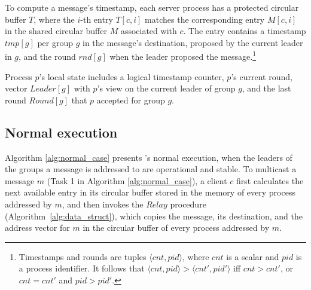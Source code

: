 To compute a message's timestamp, each server process has a protected circular buffer $T$, where the $i$-th entry $T[c,i]$ matches the corresponding entry $M[c,i]$ in the shared circular buffer $M$ associated with $c$.
The entry contains a timestamp $tmp[g]$ per group $g$ in the message's destination, proposed by the current leader in $g$, and the round $rnd[g]$ when the leader proposed the message.\footnote{Timestamps and rounds are tuples $\langle cnt,pid \rangle$, where $cnt$ is a scalar and $pid$ is a process identifier. It follows that $\langle cnt,pid \rangle > \langle cnt',pid' \rangle$ iff $cnt > cnt'$, or $cnt = cnt'$ and $pid > pid'$.}

Process $p$'s local state includes a logical timestamp counter, $p$'s current round, vector $Leader[g]$ with $p$'s view on the current leader of group $g$, and the last round $Round[g]$ that $p$ accepted for group $g$.











\subsection{Normal execution}
\label{sec:normalcase}



% 

Algorithm \ref{alg:normal_case} presents \libname's normal execution, when the leaders of the groups a message is addressed to are operational and stable.
To multicast a message $m$ (Task 1 in Algorithm \ref{alg:normal_case}), a client $c$ first calculates the next available entry in its circular buffer stored in the memory of every process addressed by $m$, and then invokes the $Relay$ procedure (Algorithm~\ref{alg:data_struct}), which copies the message, its destination, and the address vector for $m$ in the circular buffer of every process addressed by $m$.

